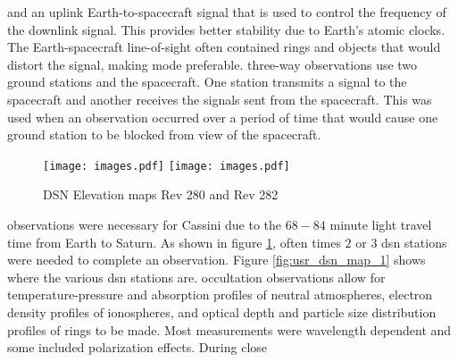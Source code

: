 \documentclass[crop=false,class=article,oneside]{standalone}
\begin{document}
            and an \gls{uplink} Earth-to-spacecraft signal
            that is used to control the frequency of the
            \gls{downlink} signal. This provides better
            stability due to Earth's atomic clocks. The
            Earth-spacecraft line-of-sight often contained
            rings and objects that would distort the signal,
            making 
            mode preferable. \Glspl{three-way observation}
            use two ground stations and the spacecraft.
            One station transmits a signal to the
            spacecraft and another receives the signals
            sent from the spacecraft. This was used when
            an observation occurred over a period of time
            that would cause one ground station to be
            blocked from view of the spacecraft.
            \begin{figure}[H]
                \centering
            	\texttt{[image: images.pdf]}
                \hfill
                \texttt{[image: images.pdf]}
            	\caption{%
            	    DSN Elevation maps Rev 280 and Rev 282
                }
            	\label{fig:usr_dsn_elav_map_1}
            \end{figure}
            observations were necessary for Cassini due to the
            $68-84$ minute light travel time from Earth to
            Saturn. As shown in figure
            \ref{fig:usr_dsn_elav_map_1}, often times $2$ or
            $3$ \gls{dsn} stations were needed to complete an
            observation. Figure \ref{fig:usr_dsn_map_1} shows
            where the various \gls{dsn} stations are.
            \Gls{occultation} observations allow for
                    {temperature-pressure}
            and \glspl{absorption profile} of
            \glspl{neutral atmosphere},
            \glspl{electron density profile} of
            \glspl{ionosphere}, and \gls{optical depth}
            and \gls{particle size distribution} profiles
            of rings to be made. Most measurements were
            wavelength dependent and some included
            \gls{polarization} effects. During close
\end{document}

